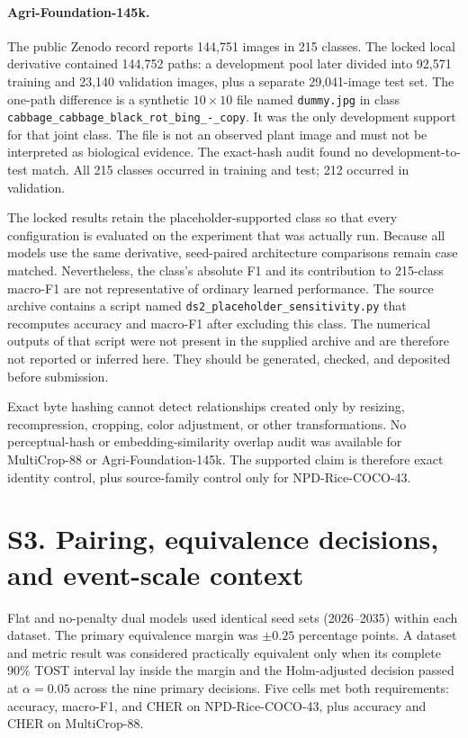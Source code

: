 \documentclass[preprint,12pt]{elsarticle}
\begin{document}
\paragraph{Agri-Foundation-145k.}
The public Zenodo record reports 144,751 images in 215 classes. The locked local
derivative contained 144,752 paths: a development pool later divided into
92,571 training and 23,140 validation images, plus a separate 29,041-image test
set. The one-path difference is a synthetic $10\times10$ file named
\texttt{dummy.jpg} in class
\texttt{cabbage\_cabbage\_black\_rot\_bing\_-\_copy}. It was the only
development support for that joint class. The file is not an observed plant
image and must not be interpreted as biological evidence. The exact-hash audit
found no development-to-test match. All 215 classes occurred in training and test;
212 occurred in validation.

The locked results retain the placeholder-supported class so that every
configuration is evaluated on the experiment that was actually run. Because all
models use the same derivative, seed-paired architecture comparisons remain
case matched. Nevertheless, the class's absolute F1 and its contribution to
215-class macro-F1 are not representative of ordinary learned performance. The
source archive contains a script named \texttt{ds2\_placeholder\_sensitivity.py}
that recomputes accuracy and macro-F1 after excluding this class. The numerical
outputs of that script were not present in the supplied archive and are
therefore not reported or inferred here. They should be generated, checked, and
deposited before submission.

Exact byte hashing cannot detect relationships created only by resizing,
recompression, cropping, color adjustment, or other transformations. No
perceptual-hash or embedding-similarity overlap audit was available for
MultiCrop-88 or Agri-Foundation-145k. The supported claim is therefore exact
identity control, plus source-family control only for NPD-Rice-COCO-43.

\section*{S3. Pairing, equivalence decisions, and event-scale context}

Flat and no-penalty dual models used identical seed sets (2026--2035) within
each dataset. The primary equivalence margin was $\pm0.25$ percentage points.
A dataset and metric result was considered practically equivalent only when its
complete 90\% TOST interval lay inside the margin and the Holm-adjusted decision
passed at $\alpha=0.05$ across the nine primary decisions. Five cells met both
requirements: accuracy, macro-F1, and CHER on NPD-Rice-COCO-43, plus accuracy
and CHER on MultiCrop-88.
\end{document}
